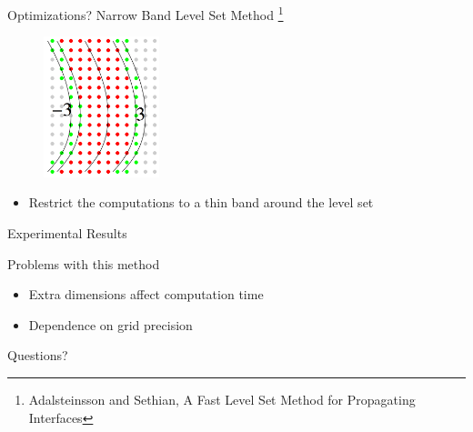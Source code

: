 \documentclass{beamer}
\begin{document}
\begin{frame}{Optimizations?}
  Narrow Band Level Set Method \footnote{Adalsteinsson and Sethian, A Fast Level Set Method for Propagating Interfaces}
  \begin{figure}[H]
  \centering
  \includegraphics[width=0.3\textwidth]{img/narrow_band.png}
  \end{figure}
  \begin{itemize}
  \item Restrict the computations to a thin band around the level set
  \end{itemize}
\end{frame}

\begin{frame}{Experimental Results}

\end{frame}


\begin{frame}{Problems with this method}
  \begin{itemize}
  \item Extra dimensions affect computation time
  \item Dependence on grid precision
  \end{itemize}
\end{frame}

\begin{frame}{Questions?}
  
\end{frame}
\end{document}
